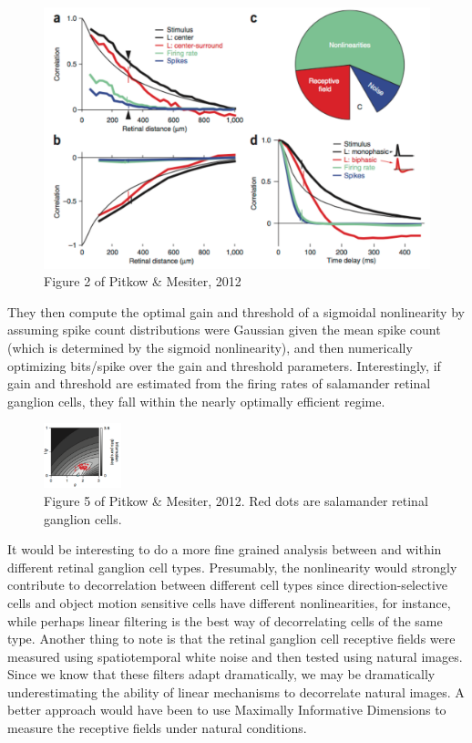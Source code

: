 \documentclass{article}
\begin{document}
\begin{figure}
\includegraphics[width=\textwidth]{Pitkow2012_fig2_cropped.pdf}
\caption*{Figure 2 of Pitkow \& Mesiter, 2012}
\end{figure}
They then compute the optimal gain and threshold of a sigmoidal nonlinearity by assuming spike count distributions were Gaussian given the mean spike count (which is determined by the sigmoid nonlinearity), and then numerically optimizing bits/spike over the gain and threshold parameters.  Interestingly, if gain and threshold are estimated from the firing rates of salamander retinal ganglion cells, they fall within the nearly optimally efficient regime.
\begin{figure}
\centering
\includegraphics[width=0.2\textwidth]{Pitkow2012_fig5.pdf}
\caption*{Figure 5 of Pitkow \& Mesiter, 2012.  Red dots are salamander retinal ganglion cells.}
\end{figure}
It would be interesting to do a more fine grained analysis between and within different retinal ganglion cell types.  Presumably, the nonlinearity would strongly contribute to decorrelation between different cell types since direction-selective cells and object motion sensitive cells have different nonlinearities, for instance, while perhaps linear filtering is the best way of decorrelating cells of the same type.  Another thing to note is that the retinal ganglion cell receptive fields were measured using spatiotemporal white noise and then tested using natural images.  Since we know that these filters adapt dramatically, we may be dramatically underestimating the ability of linear mechanisms to decorrelate natural images.  A better approach would have been to use Maximally Informative Dimensions to measure the receptive fields under natural conditions.
\end{document}
